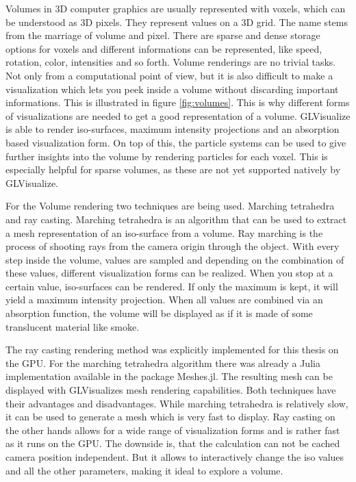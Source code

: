 Volumes in 3D computer graphics are usually represented with voxels, which can be understood as 3D pixels. 
They represent values on a 3D grid. The name stems from the marriage of volume and pixel.
There are sparse and dense storage options for voxels and different informations can be represented, like speed, rotation, color, intensities and so forth.
Volume renderings are no trivial tasks. Not only from a computational point of view, but it is also difficult to make a visualization which lets you peek inside a volume without discarding important informations. This is illustrated in figure \ref{fig:volumes}.
This is why different forms of visualizations are needed to get a good representation of a volume.
GLVisualize is able to render iso-surfaces, maximum intensity projections and an absorption based visualization form. 
On top of this, the particle systems can be used to give further insights into the volume by rendering particles for each voxel. This is especially helpful for sparse volumes, as these are not yet supported natively by GLVisualize.

For the Volume rendering two techniques are being used. 
Marching tetrahedra and ray casting\cite{marques2009gpu}. 
Marching tetrahedra is an algorithm that can be used to extract a mesh representation of an iso-surface from a volume.
Ray marching is the process of shooting rays from the camera origin through the object.
With every step inside the volume, values are sampled and depending on the combination of these values, different visualization forms can be realized. When you stop at a certain value, iso-surfaces can be rendered. 
If only the maximum is kept, it will yield a maximum intensity projection. 
When all values are combined via an absorption function, the volume will be displayed as if it is made of some translucent material like smoke.

The ray casting rendering method was explicitly implemented for this thesis on the GPU. For the marching tetrahedra algorithm there was already a Julia implementation available in the package Meshes.jl\cite{Tedrahedra}. The resulting mesh can be displayed with GLVisualizes mesh rendering capabilities.
Both techniques have their advantages and disadvantages. 
While marching tetrahedra is relatively slow, it can be used to generate a mesh which is very fast to display. 
Ray casting on the other hands allows for a wide range of visualization forms and is rather fast as it runs on the GPU. The downside is, that the calculation can not be cached camera position independent. But it allows to interactively change the iso values and all the other parameters, making it ideal to explore a volume.
 

